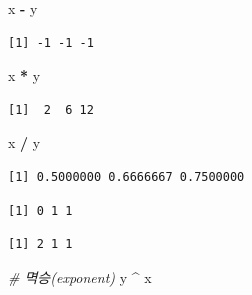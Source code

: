 \documentclass[
  11pt,
]{krantz}
\newenvironment{Shaded}{\begin{snugshade}}{\end{snugshade}}
\newcommand{\CommentTok}[1]{\textcolor[rgb]{0.37,0.37,0.37}{\textit{#1}}}
\newcommand{\NormalTok}[1]{#1}
\newcommand{\OperatorTok}[1]{\textcolor[rgb]{0.43,0.43,0.43}{\textbf{#1}}}
\newcommand{\StringTok}[1]{\textcolor[rgb]{0.5,0.5,0.5}{#1}}
\begin{document}
\begin{Shaded}
\begin{Highlighting}[]
\NormalTok{x }\OperatorTok{-}\StringTok{ }\NormalTok{y}
\end{Highlighting}
\end{Shaded}

\begin{verbatim}
[1] -1 -1 -1
\end{verbatim}

\begin{Shaded}
\begin{Highlighting}[]
\NormalTok{x }\OperatorTok{*}\StringTok{ }\NormalTok{y}
\end{Highlighting}
\end{Shaded}

\begin{verbatim}
[1]  2  6 12
\end{verbatim}

\begin{Shaded}
\begin{Highlighting}[]
\NormalTok{x }\OperatorTok{/}\StringTok{ }\NormalTok{y}
\end{Highlighting}
\end{Shaded}

\begin{verbatim}
[1] 0.5000000 0.6666667 0.7500000
\end{verbatim}

\begin{Shaded}
\end{Shaded}

\begin{verbatim}
[1] 0 1 1
\end{verbatim}

\begin{Shaded}
\end{Shaded}

\begin{verbatim}
[1] 2 1 1
\end{verbatim}

\begin{Shaded}
\begin{Highlighting}[]
\CommentTok{# 멱승(exponent)}
\NormalTok{y }\OperatorTok{^}\StringTok{ }\NormalTok{x}
\end{Highlighting}
\end{Shaded}
\end{document}
